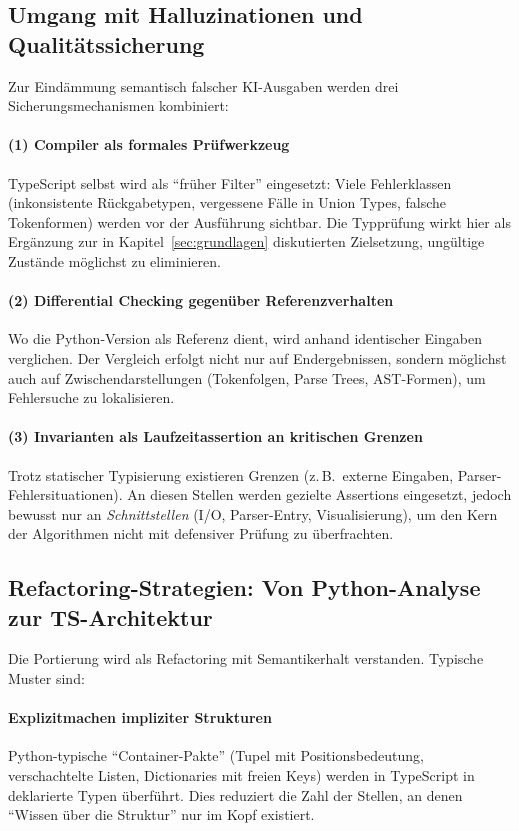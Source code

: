 \subsection{Umgang mit Halluzinationen und Qualitätssicherung}
\label{subsec:methodik_quality}

Zur Eindämmung semantisch falscher KI-Ausgaben werden drei Sicherungsmechanismen kombiniert:

\paragraph{(1) Compiler als formales Prüfwerkzeug}
TypeScript selbst wird als \enquote{früher Filter} eingesetzt: Viele Fehlerklassen (inkonsistente Rückgabetypen, vergessene Fälle in Union Types, falsche Tokenformen) werden vor der Ausführung sichtbar. Die Typprüfung wirkt hier als Ergänzung zur in Kapitel~\ref{sec:grundlagen} diskutierten Zielsetzung, ungültige Zustände möglichst zu eliminieren.

\paragraph{(2) Differential Checking gegenüber Referenzverhalten}
Wo die Python-Version als Referenz dient, wird anhand identischer Eingaben verglichen. Der Vergleich erfolgt nicht nur auf Endergebnissen, sondern möglichst auch auf Zwischendarstellungen (Tokenfolgen, Parse Trees, AST-Formen), um Fehlersuche zu lokalisieren.

\paragraph{(3) Invarianten als Laufzeitassertion an kritischen Grenzen}
Trotz statischer Typisierung existieren Grenzen (z.\,B.\ externe Eingaben, Parser-Fehlersituationen). An diesen Stellen werden gezielte Assertions eingesetzt, jedoch bewusst nur an \emph{Schnittstellen} (I/O, Parser-Entry, Visualisierung), um den Kern der Algorithmen nicht mit defensiver Prüfung zu überfrachten.

\subsection{Refactoring-Strategien: Von Python-Analyse zur TS-Architektur}
\label{subsec:methodik_refactor}

Die Portierung wird als Refactoring mit Semantikerhalt verstanden. Typische Muster sind:

\paragraph{Explizitmachen impliziter Strukturen}
Python-typische \enquote{Container-Pakte} (Tupel mit Positionsbedeutung, verschachtelte Listen, Dictionaries mit freien Keys) werden in TypeScript in deklarierte Typen überführt. Dies reduziert die Zahl der Stellen, an denen \enquote{Wissen über die Struktur} nur im Kopf existiert.

